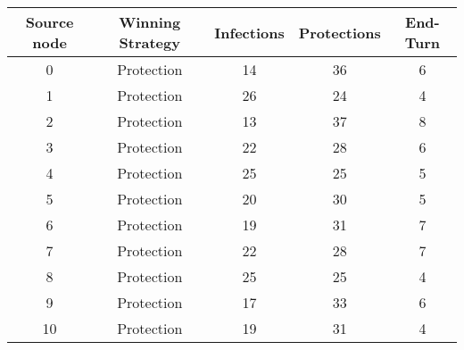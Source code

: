 \documentclass[results.tex]{subfiles}
\begin{document}
    \begin{center}
        \begin{tabular}{| c || c | c | c | c |}
            \hline
            {\bfseries Source node} & {\bfseries Winning Strategy} & {\bfseries Infections} & {\bfseries Protections}
            & {\bfseries End-Turn}
            \\  %
            \hline\hline
            0                       & Protection                   & 14                     & 36                      & 6                    \\
            \hline
            1                       & Protection                   & 26                     & 24                      & 4                    \\
            \hline
            2                       & Protection                   & 13                     & 37                      & 8                    \\
            \hline
            3                       & Protection                   & 22                     & 28                      & 6                    \\
            \hline
            4                       & Protection                   & 25                     & 25                      & 5                    \\
            \hline
            5                       & Protection                   & 20                     & 30                      & 5                    \\
            \hline
            6                       & Protection                   & 19                     & 31                      & 7                    \\
            \hline
            7                       & Protection                   & 22                     & 28                      & 7                    \\
            \hline
            8                       & Protection                   & 25                     & 25                      & 4                    \\
            \hline
            9                       & Protection                   & 17                     & 33                      & 6                    \\
            \hline
            10                      & Protection                   & 19                     & 31                      & 4                    \\

\end{tabular}
\end{center}
\end{document}
